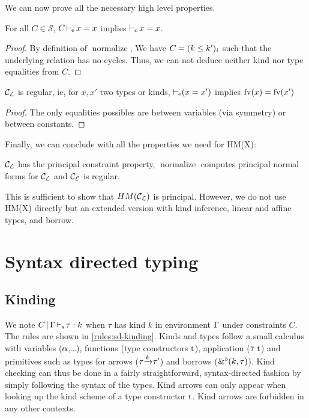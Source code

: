 We can now prove all the necessary high level properties.

\begin{lemma}
  For all $C\in\mathcal S$, $C \operatorname{\vdash_e} x = x$ implies
  $\operatorname{\vdash_e} x = x$.
\end{lemma}
\begin{proof}
  By definition of $\operatorname{normalize}$, We have $C = (k \leq k')_i$
  such that the underlying relation has no cycles.
  Thus, we can not deduce neither kind nor type equalities from $C$.
\end{proof}

\begin{property}
  ${\mathcal C_{\mathcal L}}$ is regular, ie, for $x, x'$ two types or kinds,
  $\operatorname{\vdash_e} (x = x')$ implies
  $\operatorname{fv}(x) = \operatorname{fv}(x')$
\end{property}
\begin{proof}
  The only equalities possibles are between variables (via symmetry) or
  between constants.
\end{proof}

Finally, we can conclude with all the properties we need for
HM(X):

\begin{theorem}
  ${\mathcal C_{\mathcal L}}$ has the principal constraint property,
  $\operatorname{normalize}$ computes principal normal forms for ${\mathcal C_{\mathcal L}}$
  and ${\mathcal C_{\mathcal L}}$ is regular.
\end{theorem}


This is sufficient to show that $HM({\mathcal C_{\mathcal L}})$ is principal. However,
we do not use HM(X) directly but an extended version with kind inference,
linear and affine types, and borrow.


\section{Syntax directed typing}
\label{appendix:sdtyping}

\subsection{Kinding}

We note $C \operatorname{|} \Gamma \operatorname{\vdash_s} \tau : k$
when $\tau$ has kind $k$ in environment $\Gamma$ under constraints $C$.
The rules are shown in \cref{rules:sd-kinding}.
Kinds and types follow a small calculus with variables ($\alpha$,\dots),
functions (type constructors $\mathrm{t}$), application ($\overline{\tau_{{}}}\ \mathrm{t}$)
and primitives such as types for arrows ($\tau{\xrightarrow{k}}\tau'$) and
borrows (${\&}^{\textit{b}}(k,\tau)$).
Kind checking can thus be done in a fairly straightforward, syntax-directed
fashion by simply following
the syntax of the types. Kind arrows can only appear when looking
up the kind scheme of a type constructor $\mathrm{t}$. Kind arrows are forbidden
in any other contexts.


